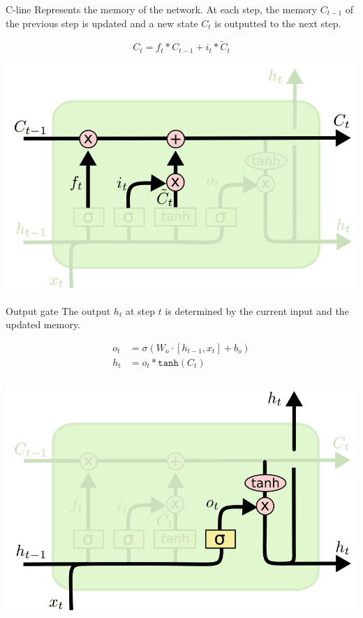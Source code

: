 \begin{descriptionlist}
    \item[C-line] 
        Represents the memory of the network.
        At each step, the memory $C_{t-1}$ of the previous step is updated and a new state $C_t$ is outputted to the next step.\\
        \begin{minipage}{0.6\linewidth}
            \[ C_t = f_t * C_{t-1} + i_t * \tilde{C}_t \]
        \end{minipage}
        \begin{minipage}{0.35\linewidth}
            \centering
            \includegraphics[width=0.85\linewidth]{./img/cline_update.png}
        \end{minipage}

    \item[Output gate] 
        The output $h_t$ at step $t$ is determined by the current input and the updated memory.\\
        \begin{minipage}{0.6\linewidth}
            \[
                \begin{split}
                    o_t &= \sigma( W_o \cdot [h_{t-1}, x_t] + b_o) \\
                    h_t &= o_t * \texttt{tanh}(C_t) \\
                \end{split}
            \]
        \end{minipage}
        \begin{minipage}{0.35\linewidth}
            \centering
            \includegraphics[width=0.85\linewidth]{./img/output_gate.png}
        \end{minipage}
\end{descriptionlist}


